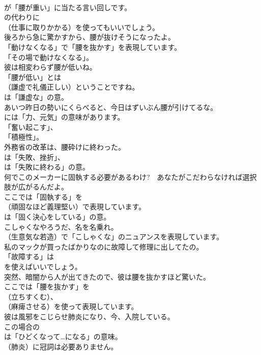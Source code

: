 \documentclass[8pt]{extreport}
\begin{document}
\begin{CJK}{UTF8}{min}
\\	が「腰が重い」に当たる言い回しです。
\\	の代わりに 
\\	（仕事に取りかかる）を使ってもいいでしょう。	
\\	後ろから急に驚かすから、腰が抜けそうになったよ。 
\\	「動けなくなる」で「腰を抜かす」を表現しています。
\\	「その場で動けなくなる」。	
\\	彼は相変わらず腰が低いね。 
\\	「腰が低い」とは 
\\	（謙虚で礼儀正しい）ということですね。
\\	は「謙虚な」の意。	
\\	あいつ昨日の勢いにくらべると、今日はずいぶん腰が引けてるな。 
\\	には「力、元気」の意味があります。
\\	「奮い起こす」、
\\	「積極性」。	
\\	外務省の改革は、腰砕けに終わった。 
\\	は「失敗、挫折」、
\\	は「失敗に終わる」の意。	
\\	何でこのメーカーに固執する必要があるわけ?　あなたがこだわらなければ選択肢が広がるんだよ。 
\\	ここでは「固執する」を 
\\	（頑固なほど義理堅い）で表現しています。
\\	は「固く決心をしている」の意。	
\\	こしゃくなやろうだ、名を名乗れ。 
\\	（生意気な若造）で「こしゃくな」のニュアンスを表現しています。	
\\	私のマックが買ったばかりなのに故障して修理に出してたの。 
\\	「故障する」は
\\	を使えばいいでしょう。	
\\	突然、暗闇から人が出てきたので、彼は腰を抜かすほど驚いた。 
\\	ここでは「腰を抜かす」を 
\\	（立ちすくむ）、
\\	（麻痺させる）を使って表現しています。	
\\	彼は風邪をこじらせ肺炎になり、今、入院している。 
\\	この場合の
\\	は「ひどくなって…になる」の意味。
\\	（肺炎）に冠詞は必要ありません。	

\end{CJK}
\end{document}
